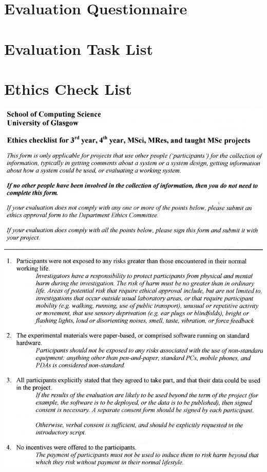 \documentclass{l4proj}
\begin{document}
\chapter{Evaluation Questionnaire}


\chapter{Evaluation Task List}


\chapter{Ethics Check List}
\includegraphics[scale=0.6]{images/EthicsChecklist.jpg}
\newpage
\end{document}
